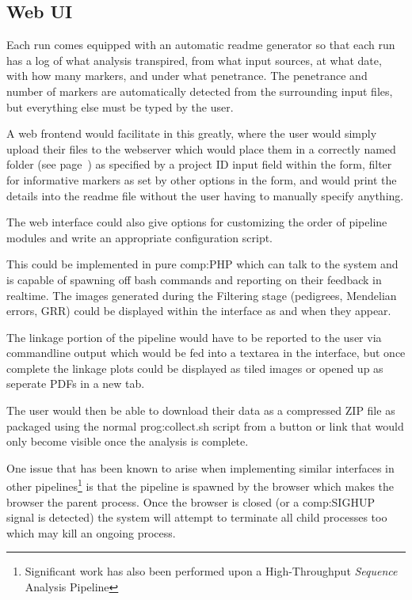\subsection{Web UI}

Each run comes equipped with an automatic readme generator so that each run has a log of what analysis transpired, from what input sources, at what date, with how many markers, and under what penetrance. The penetrance and number of markers are automatically detected from the surrounding input files, but everything else must be typed by the user.

A web frontend would facilitate in this greatly, where the user would simply upload their files to the webserver which would place them in a correctly named folder (see page~\pageref{ref:meth:foldconv}) as specified by a project ID input field within the form, filter for informative markers as set by other options in the form, and would print the details into the readme file without the user having to manually specify anything.

The web interface could also give options for customizing the order of pipeline modules and write an appropriate configuration script.

This could be implemented in pure \gls{comp:PHP} \cite{bakken2000php} which can talk to the system and is capable of spawning off bash commands and reporting on their feedback in realtime. The images generated during the Filtering stage (pedigrees, Mendelian errors, GRR) could be displayed within the interface as and when they appear.

The linkage portion of the pipeline would have to be reported to the user via commandline output which would be fed into a textarea in the interface, but once complete the linkage plots could be displayed as tiled images or opened up as seperate PDFs in a new tab.

The user would then be able to download their data as a compressed ZIP file as packaged using the normal \gls{prog:collect.sh} script from a button or link that would only become visible once the analysis is complete.

One issue that has been known to arise when implementing similar interfaces in other pipelines\footnote{Significant work has also been performed upon a High-Throughput \textit{Sequence} Analysis Pipeline} is that the pipeline is spawned by the browser which makes the browser the parent process. Once the browser is closed (or a \gls{comp:SIGHUP} signal is detected) the system will attempt to terminate all child processes too which may kill an ongoing process.

